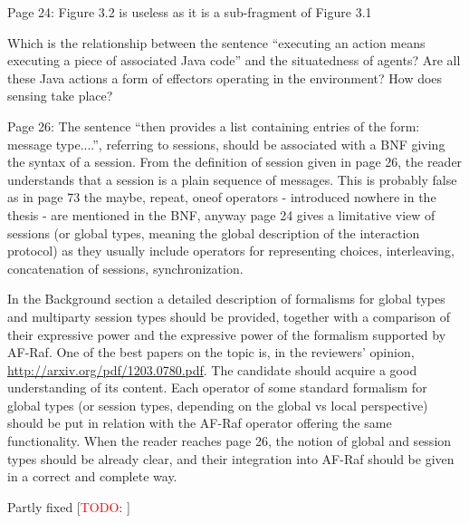 \documentclass{article}
\newcommand{\todo}[1]{[\textcolor{red}{TODO}: #1]}
\newenvironment{them}{\noindent\begingroup\color{blue}}{\endgroup\par}
\begin{document}
\begin{them}

Page 24:
Figure 3.2 is useless as it is a sub-fragment of Figure 3.1
\end{them}
\todo{justify this} 

\begin{them}

Which is the relationship between the sentence “executing an action means
executing a piece of associated Java code” and the situatedness of agents? Are
all these Java actions a form of effectors operating in the environment? How
does sensing take place?

\end{them}
\todo{explain this} 

\begin{them}

Page 26:
The sentence “then provides a list containing entries of the form: message
type....”, referring to sessions, should be associated with a BNF giving the
syntax of a session. From the definition of session given in page 26, the
reader understands that a session is a plain sequence of messages. This is
probably false as in page 73 the maybe, repeat, oneof operators - introduced
nowhere in the thesis - are mentioned in the BNF, anyway page 24 gives a
limitative view of sessions (or global types, meaning the global description of
the interaction protocol) as they usually include operators for representing
choices, interleaving, concatenation of sessions, synchronization. 

\end{them}
\todo{explain this} 

\begin{them}

In the Background section a detailed description of formalisms for global types
and multiparty session types should be provided, together with a comparison of
their expressive power and the expressive power of the formalism supported by
AF-Raf. One of the best papers on the topic is, in the reviewers' opinion,
\url{http://arxiv.org/pdf/1203.0780.pdf}. The candidate should acquire a good
understanding of its content. Each operator of some standard formalism for
global types (or session types, depending on the global vs local perspective)
should be put in relation with the AF-Raf operator offering the same
functionality. When the reader reaches page 26, the notion of global and
session types should be already clear, and their integration into AF-Raf should
be given in a correct and complete way.

\end{them}
Partly fixed
\todo{} 
\end{document}

